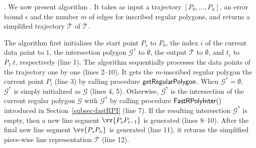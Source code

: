 . We now present algorithm \cist. It takes as input a trajectory ${[P_0, \ldots, P_n]}$, an error bound $\epsilon$ and the number $m$ of edges for inscribed regular polygons, and returns a simplified  trajectory $\overline{\mathcal{T}}$ of $\dddot{\mathcal{T}}$.



The algorithm first initializes the start point $P_s$ to $P_0$, the index $i$ of the current data point to $1$, the intersection polygon $\mathcal{G}^*$ to $\emptyset$, the output $\overline{\mathcal{T}}$ to $\emptyset$, and $t_c$ to $P_1.t$, respectively (line 1).
%
The algorithm sequentially processes the data points of the trajectory one by one  (lines 2--10). It gets the $m$-inscribed regular polygon \wrt the current point $P_i$ (line 3) by calling procedure ${\mathsf{getRegularPolygon}}$. When $\mathcal{G}^* = \emptyset$, $\mathcal{G}^*$ is simply initialized as $\mathcal{G}$ (lines 4, 5). Otherwise,
$\mathcal{G}^*$ is  the intersection of the current regular polygon $\mathcal{G}$ with $\mathcal{G}^*$ by calling procedure ${\mathsf{FastRPolyInter}}()$ introduced in Section~\ref{subsec-fastRPI} (line 7). If the resulting intersection $\mathcal{G}^*$ is empty, then a new line segment $\vv{P_sP_{i-1}}$ is generated (lines 8--10).
After the  final new line segment $\vv{P_sP_{n}}$ is generated (line 11), it returns the simplified  piece-wise line representation $\overline{\mathcal{T}}$ (line 12).





